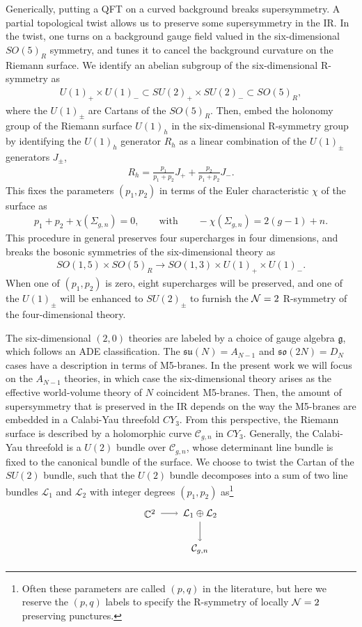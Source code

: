 \documentclass[a4paper,11pt]{article}
\newcommand{\ba}[1]{\begin{align} #1 \end{align} }
\newcommand{\bs}[1]{\begin{split} #1 \end{split} }
\def\CN{{\cal N}}
\newcommand{\mc}[1]{\mathcal{ #1} }
\begin{document}
Generically, putting a QFT on a curved background breaks supersymmetry. A partial topological twist allows us to preserve some supersymmetry in the IR. In the twist, one turns on a background gauge field valued in the six-dimensional $SO(5)_R$ symmetry, and tunes it to cancel the background curvature on the Riemann surface. We identify an abelian subgroup of the six-dimensional R-symmetry as
	\ba{
	U(1)_+\times U(1)_-\subset SU(2)_+ \times SU(2)_-\subset SO(5)_R,\label{eq:symm}
	}
where the $U(1)_\pm$ are Cartans of the $SO(5)_R$. Then, embed the holonomy group of the Riemann surface $U(1)_h$ in the six-dimensional R-symmetry group by identifying the $U(1)_h$ generator $R_h$ as a linear combination of the $U(1)_\pm$ generators $J_\pm$, 
	\ba{
	R_h=\frac{p_1}{p_1+p_2}J_+ + \frac{p_2}{p_1+p_2}J_-. \label{eq:embed}
	}
This fixes the parameters $(p_1,p_2)$ in terms of the Euler characteristic $\chi$ of the surface as
	\ba{
	p_1+p_2+\chi(\Sigma_{g,n})=0,\qquad \text{with}\qquad -\chi(\Sigma_{g,n}) = 2(g-1)+n.\label{eq:conditiona}
	}
This procedure in general preserves four supercharges in four dimensions, and breaks the bosonic symmetries of the six-dimensional theory as
	\ba{
	SO(1,5)\times SO(5)_R\to SO(1,3)\times U(1)_+\times U(1)_-.\label{eq:breaking}
	}
When one of $(p_1,p_2)$ is zero, eight supercharges will be preserved, and one of the $U(1)_\pm$ will be enhanced to $SU(2)_\pm$ to furnish the $\CN=2$ R-symmetry of the four-dimensional theory.

The six-dimensional $(2,0)$ theories are labeled by a choice of gauge algebra $\mathfrak{g}$, which follows an ADE classification. The $\mathfrak{su}(N)=A_{N-1}$ and $\mathfrak{so}(2N)=D_{N}$ cases have a description in terms of M5-branes. In the present work we will focus on the $A_{N-1}$ theories, in which case the six-dimensional theory arises as the effective world-volume theory of $N$ coincident M5-branes. Then, the amount of supersymmetry that is preserved in the IR depends on the way the M5-branes are embedded in a Calabi-Yau threefold $CY_3$. From this perspective, the Riemann surface is described by a holomorphic curve $\mc{C}_{g,n}$ in $CY_3$. Generally, the Calabi-Yau threefold is a $U(2)$ bundle over $\mc{C}_{g,n}$, whose determinant line bundle is fixed to the canonical bundle of the surface. We choose to twist the Cartan of the $SU(2)$ bundle, such that the $U(2)$ bundle decomposes into a sum of two line bundles $\mc{L}_1$ and $\mc{L}_2$ with integer degrees $(p_1,p_2)$ as\footnote{Often these parameters are called $(p,q)$ in the literature, but here we reserve the $(p,q)$ labels to specify the R-symmetry of locally $\CN=2$ preserving punctures.}
	\ba{ \bs{
	\begin{tikzpicture}
	\node at (0,0) {$\mathbb{C}^2$};
	\draw[->] (0.4,0) -- (1,0);
	\node at (1.8,0) {$\mc{L}_1\oplus \mc{L}_2$};
	\draw[->] (1.8,-.3) -- (1.8,-1);
	\node at (1.8,-1.3) {$\mc{C}_{g,n}$};  \label{eq:cygeometry} 
	\end{tikzpicture} }}
	
\end{document}
